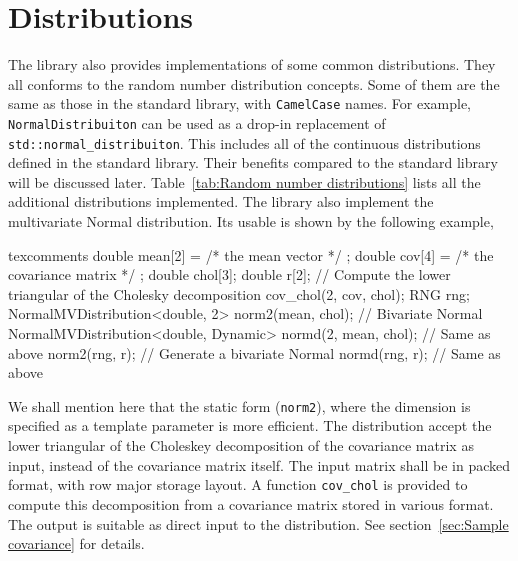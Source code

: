 \section{Distributions}
\label{sec:Distributions}

The library also provides implementations of some common distributions. They
all conforms to the \cppoo random number distribution concepts. Some of them
are the same as those in the \cppoo standard library, with \verb|CamelCase|
names. For example, \verb|NormalDistribuiton| can be used as a drop-in
replacement of \verb|std::normal_distribuiton|. This includes all of the
continuous distributions defined in the standard library. Their benefits
compared to the standard library will be discussed later.
Table~\ref{tab:Random number distributions} lists all the additional
distributions implemented. The library also implement the multivariate Normal
distribution. Its usable is shown by the following example,
\begin{cppcode*}{texcomments}
  double mean[2] = { /* the mean vector */ };
  double cov[4] = { /* the covariance matrix */ };
  double chol[3];
  double r[2];
  // Compute the lower triangular of the Cholesky decomposition
  cov_chol(2, cov, chol);
  RNG rng;
  NormalMVDistribution<double, 2> norm2(mean, chol); // Bivariate Normal
  NormalMVDistribution<double, Dynamic> normd(2, mean, chol); // Same as above
  norm2(rng, r); // Generate a bivariate Normal
  normd(rng, r); // Same as above
\end{cppcode*}
We shall mention here that the static form (\verb|norm2|), where the dimension
is specified as a template parameter is more efficient. The distribution accept
the lower triangular of the Choleskey decomposition of the covariance matrix as
input, instead of the covariance matrix itself. The input matrix shall be in
packed format, with row major storage layout. A function \verb|cov_chol| is
provided to compute this decomposition from a covariance matrix stored in
various format. The output is suitable as direct input to the distribution. See
section~\ref{sec:Sample covariance} for details.

